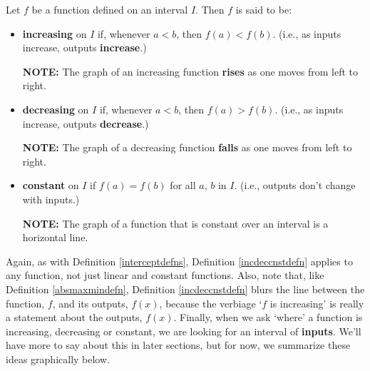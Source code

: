 \documentclass{ximera}
\begin{document}
\colorbox{ResultColor}{\bbm

\begin{defn}

\label{incdeccnstdefn}

Let $f$ be a function defined on an interval $I$.  Then $f$ is said to be:

\begin{itemize}

\item  \textbf{increasing} on $I$ if, whenever $a < b$, then $f(a) < f(b)$.   (i.e., as inputs increase, outputs \textbf{increase}.)

\textbf{NOTE:}  The graph of an increasing function  \textbf{rises} as one moves from left to right.

\item  \textbf{decreasing} on $I$ if, whenever $a < b$, then $f(a) > f(b)$.  (i.e., as inputs increase, outputs \textbf{decrease}.)

\textbf{NOTE:}  The graph of a decreasing function \textbf{falls} as one moves from left to right.

\item  \textbf{constant} on $I$ if $f(a) = f(b)$ for all $a$, $b$ in $I$.  (i.e., outputs don't change with inputs.)

\textbf{NOTE:}  The graph of a function that is constant over an interval is a horizontal line.

\end{itemize}

\end{defn}

\ebm}



Again, as with Definition \ref{interceptdefns}, Definition  \ref{incdeccnstdefn} applies to any function, not just linear and constant functions.  Also, note that, like Definition \ref{absmaxmindefn}, Definition \ref{incdeccnstdefn}  blurs the line between the function, $f$, and its outputs, $f(x)$, because the verbiage `$f$ is increasing' is really a statement about the outputs, $f(x)$.  Finally, when we ask `where' a function is increasing, decreasing or constant, we are looking for an interval of \textbf{inputs}.  We'll have more to say about this in later sections, but for now, we summarize these ideas graphically below.
\end{document}
